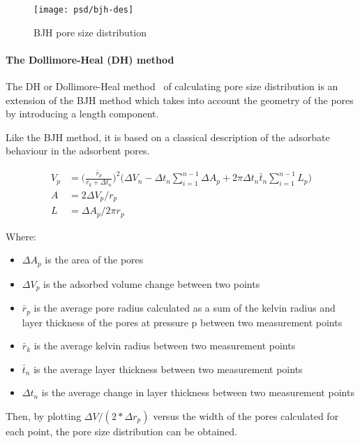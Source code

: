 \begin{figure}[!htb]
    \centering
    \texttt{[image: psd/bjh-des]}
    \caption{BJH pore size distribution}%
    \label{pyg:fgr:bjhplot}
\end{figure}

\paragraph{The Dollimore-Heal (DH) method}

The DH or Dollimore-Heal
method~\cite{dollimorePoresizeDistributionTypical1970}
of calculating pore size distribution is an
extension of the BJH method which takes into account the
geometry of the pores by introducing a length component.

Like the BJH method, it is based on a classical description of
the adsorbate behaviour in the adsorbent pores.

\begin{align}
	V_p & = \Big(\frac{\bar{r}_p}{\bar{r}_k + \Delta t_n}\Big)^2
	\Big(\Delta V_n - \Delta t_n \sum_{i=1}^{n-1} \Delta A_p
	+ 2 \pi \Delta t_n \bar{t}_n \sum_{i=1}^{n-1} L_p\Big)       \\
	A   & = 2 \Delta V_p / r_p                                   \\
	L   & = \Delta A_p / 2 \pi r_p
\end{align}

Where:
\begin{itemize}

	\item \(\Delta A_p\) is the area of the pores
	\item \(\Delta V_p\) is the adsorbed volume change between two points
	\item \(\bar{r}_p\) is the average pore radius calculated as a sum of the
	      kelvin radius and layer thickness of the pores at pressure p between two
	      measurement points
	\item \(\bar{r}_k\) is the average kelvin radius between two measurement points
	\item \(\bar{t}_n\) is the average layer thickness between two measurement points
	\item \(\Delta t_n\) is the average change in layer thickness between two measurement points
\end{itemize}

Then, by plotting \(\Delta V/(2*\Delta r_p)\) versus the width of the pores calculated
for each point, the pore size distribution can be obtained.

